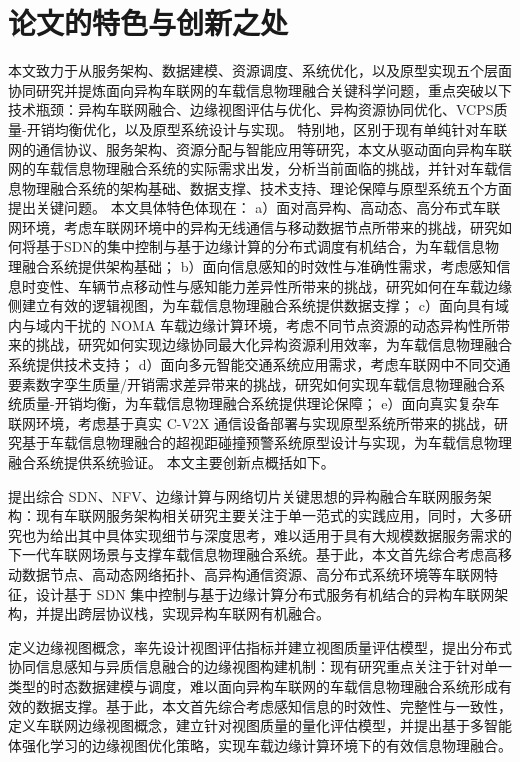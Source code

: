 \section{论文的特色与创新之处}\label{section 1-6}

本文致力于从服务架构、数据建模、资源调度、系统优化，以及原型实现五个层面协同研究并提炼面向异构车联网的车载信息物理融合关键科学问题，重点突破以下技术瓶颈：异构车联网融合、边缘视图评估与优化、异构资源协同优化、VCPS质量-开销均衡优化，以及原型系统设计与实现。
特别地，区别于现有单纯针对车联网的通信协议、服务架构、资源分配与智能应用等研究，本文从驱动面向异构车联网的车载信息物理融合系统的实际需求出发，分析当前面临的挑战，并针对车载信息物理融合系统的架构基础、数据支撑、技术支持、理论保障与原型系统五个方面提出关键问题。
本文具体特色体现在：
a）面对高异构、高动态、高分布式车联网环境，考虑车联网环境中的异构无线通信与移动数据节点所带来的挑战，研究如何将基于SDN的集中控制与基于边缘计算的分布式调度有机结合，为车载信息物理融合系统提供架构基础；
b）面向信息感知的时效性与准确性需求，考虑感知信息时变性、车辆节点移动性与感知能力差异性所带来的挑战，研究如何在车载边缘侧建立有效的逻辑视图，为车载信息物理融合系统提供数据支撑；
c）面向具有域内与域内干扰的 NOMA 车载边缘计算环境，考虑不同节点资源的动态异构性所带来的挑战，研究如何实现边缘协同最大化异构资源利用效率，为车载信息物理融合系统提供技术支持；
d）面向多元智能交通系统应用需求，考虑车联网中不同交通要素数字孪生质量/开销需求差异带来的挑战，研究如何实现车载信息物理融合系统质量-开销均衡，为车载信息物理融合系统提供理论保障；
e）面向真实复杂车联网环境，考虑基于真实 C-V2X 通信设备部署与实现原型系统所带来的挑战，研究基于车载信息物理融合的超视距碰撞预警系统原型设计与实现，为车载信息物理融合系统提供系统验证。
本文主要创新点概括如下。

 提出综合 SDN、NFV、边缘计算与网络切片关键思想的异构融合车联网服务架构：现有车联网服务架构相关研究主要关注于单一范式的实践应用，同时，大多研究也为给出其中具体实现细节与深度思考，难以适用于具有大规模数据服务需求的下一代车联网场景与支撑车载信息物理融合系统。基于此，本文首先综合考虑高移动数据节点、高动态网络拓扑、高异构通信资源、高分布式系统环境等车联网特征，设计基于 SDN 集中控制与基于边缘计算分布式服务有机结合的异构车联网架构，并提出跨层协议栈，实现异构车联网有机融合。

 定义边缘视图概念，率先设计视图评估指标并建立视图质量评估模型，提出分布式协同信息感知与异质信息融合的边缘视图构建机制：现有研究重点关注于针对单一类型的时态数据建模与调度，难以面向异构车联网的车载信息物理融合系统形成有效的数据支撑。基于此，本文首先综合考虑感知信息的时效性、完整性与一致性，定义车联网边缘视图概念，建立针对视图质量的量化评估模型，并提出基于多智能体强化学习的边缘视图优化策略，实现车载边缘计算环境下的有效信息物理融合。

